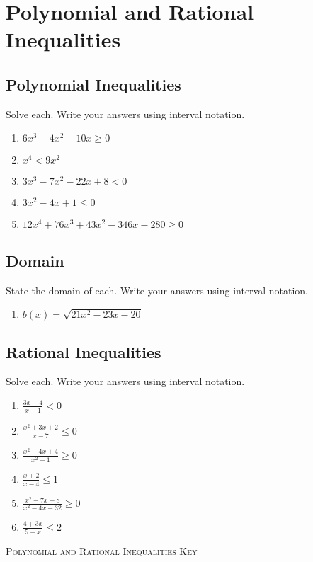 \chapter{Polynomial and Rational Inequalities}

\section{Polynomial Inequalities}

Solve each. Write your answers using interval notation.
\begin{enumerate}
\item $6x^3-4x^2-10x \geq 0$
\item $x^4 < 9x^2$
\item $3x^3-7x^2-22x+8 < 0$
\item $3x^2 - 4x + 1 \leq 0$
\item $12x^4 + 76x^3 + 43x^2 - 346x - 280 \geq 0$
\end{enumerate}

\section{Domain}

State the domain of each. Write your answers using interval notation.
\begin{enumerate}
\item $b(x) = \sqrt{21x^2 - 23x - 20}$
\end{enumerate}

\section{Rational Inequalities}

Solve each. Write your answers using interval notation.
\begin{enumerate}
\setlength\itemsep{10pt}
\item $\frac{3x-4}{x+1}<0$
\item $\frac{x^2+3x+2}{x-7} \leq 0$
\item $\frac{x^2-4x+4}{x^2-1} \geq 0$
\item $\frac{x+2}{x-4} \leq 1$
\item $\frac{x^2-7x-8}{x^2-4x-32} \geq 0$
\item $\frac{4+3x}{5-x} \leq 2$
\end{enumerate}

\newpage

\textsc{Polynomial and Rational Inequalities Key}

